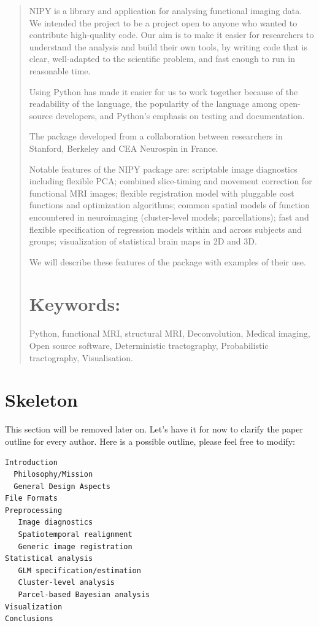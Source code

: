 \documentclass{bioinfo}
\begin{document}
\begin{abstract}
\noindent

NIPY is a library and application for analysing functional imaging data.   We
intended the project to be a project open to anyone who wanted to contribute
high-quality code.  Our aim is to make it easier for researchers to understand
the analysis and build their own tools, by writing code that is clear,
well-adapted to the scientific problem, and fast enough to run in reasonable
time.

Using Python has made it easier for us to work together because of the
readability of the language, the popularity of the language among
open-source developers, and Python's emphasis on testing and
documentation.

The package developed from a collaboration between researchers in Stanford,
Berkeley and CEA Neurospin in France.

Notable features of the NIPY package are: scriptable image diagnostics
including flexible PCA; combined slice-timing and movement correction
for functional MRI images; flexible registration model with pluggable
cost functions and optimization algorithms; common spatial models of
function encountered in neuroimaging (cluster-level models;
parcellations); fast and flexible specification of regression models
within and across subjects and groups; visualization of statistical
brain maps in 2D and 3D.

We will describe these features of the package with examples of their use.

\section{Keywords:} Python, functional MRI, structural MRI, 
Deconvolution, Medical imaging, Open source software, Deterministic
tractography, Probabilistic tractography, Visualisation.

\end{abstract}

\section*{Skeleton}

This section will be removed later on. Let's have it for now to
clarify the paper outline for every author. Here is a possible
outline, please feel free to modify:

\begin{verbatim}
Introduction
  Philosophy/Mission
  General Design Aspects
File Formats 
Preprocessing
   Image diagnostics
   Spatiotemporal realignment
   Generic image registration
Statistical analysis
   GLM specification/estimation
   Cluster-level analysis
   Parcel-based Bayesian analysis
Visualization
Conclusions
\end{verbatim}
\end{document}
